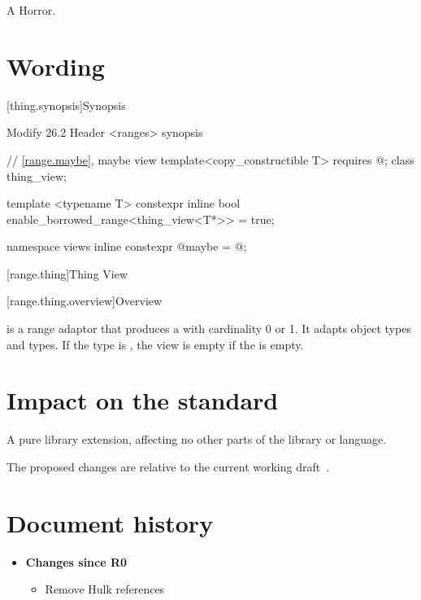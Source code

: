 \documentclass[a4paper,10pt,oneside,openany,final,article]{memoir}
\begin{document}
A Horror.

\chapter{Wording}
\begin{wording}

  [thing.synopsis]{Synopsis}


  Modify 26.2 Header <ranges> synopsis

  \begin{addedblock}
    \begin{codeblock}
      // \ref{range.maybe}, maybe view
      template<copy_constructible T>
      requires @\seebelow@;
      class thing_view;

      template <typename T>
      constexpr inline bool enable_borrowed_range<thing_view<T*>> = true;

      namespace views { inline constexpr @\unspec@ maybe = @\unspec@; }
    \end{codeblock}
  \end{addedblock}

  [range.thing]{Thing View}

  [range.thing.overview]{Overview}

  \pnum
   is a range adaptor that produces a  with cardinality 0 or 1. It adapts  object types and  types. If the type is , the view is empty if the  is empty.



\end{wording}
\chapter{Impact on the standard}

A pure library extension, affecting no other parts of the library or language.

The proposed changes are relative to the current working draft~\cite{N4910}.

\chapter*{Document history}

\begin{itemize}
\item \textbf{Changes since R0}
  \begin{itemize}
  \item Remove Hulk references
  \end{itemize}
\end{itemize}

\renewcommand{\bibname}{References}



\nocite{thing_xyzzy:online}
\end{document}
